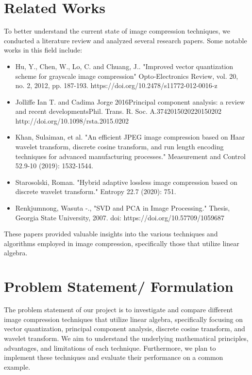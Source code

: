 \documentclass{article}
\begin{document}
\section{Related Works}
To better understand the current state of image compression techniques, we conducted a literature review and analyzed several research papers. Some notable works in this field include:
\begin{itemize}
    \item Hu, Y., Chen, W., Lo, C. and Chuang, J.. "Improved vector quantization scheme for grayscale image compression" Opto-Electronics Review, vol. 20, no. 2, 2012, pp. 187-193. https://doi.org/10.2478/s11772-012-0016-z
    \item Jolliffe Ian T. and Cadima Jorge 2016Principal component analysis: a review and recent developmentsPhil. Trans. R. Soc. A.3742015020220150202\\
    http://doi.org/10.1098/rsta.2015.0202
    \item Khan, Sulaiman, et al. "An efficient JPEG image compression based on Haar wavelet transform, discrete cosine transform, and run length encoding techniques for advanced manufacturing processes." Measurement and Control 52.9-10 (2019): 1532-1544.
    \item Starosolski, Roman. "Hybrid adaptive lossless image compression based on discrete wavelet transform." Entropy 22.7 (2020): 751.
    \item Renkjumnong, Wasuta -., "SVD and PCA in Image Processing." Thesis, Georgia State University, 2007.
    doi: https://doi.org/10.57709/1059687 
\end{itemize}
These papers provided valuable insights into the various techniques and algorithms employed in image compression, specifically those that utilize linear algebra.

\section{Problem Statement/ Formulation}
The problem statement of our project is to investigate and compare different image compression techniques that utilize linear algebra, specifically focusing on vector quantization, principal component analysis, discrete cosine transform, and wavelet transform. We aim to understand the underlying mathematical principles, advantages, and limitations of each technique. Furthermore, we plan to implement these techniques and evaluate their performance on a common example.
\end{document}

